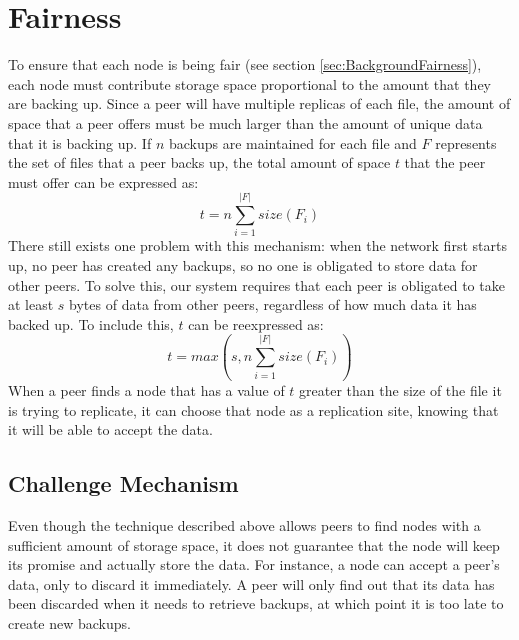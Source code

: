 \documentclass[12pt]{report}
\begin{document}
\section{Fairness} \label{sec:Fairness}
To ensure that each node is being fair (see section \ref{sec:BackgroundFairness}), each node must contribute storage space proportional to the amount that they are backing up. Since a peer will have multiple replicas of each file, the amount of space that a peer offers must be much larger than the amount of unique data that it is backing up. If $n$ backups are maintained for each file and $F$ represents the set of files that a peer backs up, the total amount of space $t$ that the peer must offer can be expressed as:
\begin{equation}
t=n\sum\limits_{i=1}^{|F|} size(F_i)
\end{equation}
There still exists one problem with this mechanism: when the network first starts up, no peer has created any backups, so no one is obligated to store data for other peers. To solve this, our system requires that each peer is obligated to take at least $s$ bytes of data from other peers, regardless of how much data it has backed up. To include this, $t$ can be reexpressed as:
\begin{equation}
t=max(s,n\sum\limits_{i=1}^{|F|} size(F_i))
\end{equation}
When a peer finds a node that has a value of $t$ greater than the size of the file it is trying to replicate, it can choose that node as a replication site, knowing that it will be able to accept the data.

\subsection{Challenge Mechanism} \label{subsec:ChallengeMechanism_sec:Fairness_chap:BTBackup}
Even though the technique described above allows peers to find nodes with a sufficient amount of storage space, it does not guarantee that the node will keep its promise and actually store the data. For instance, a node can accept a peer's data, only to discard it immediately. A peer will only find out that its data has been discarded when it needs to retrieve backups, at which point it is too late to create new backups.
\end{document}
